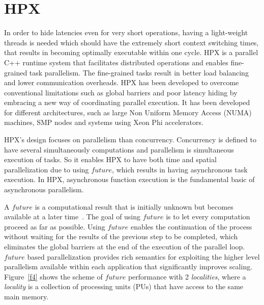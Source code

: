\documentclass[conference]{IEEEtran}
\begin{document}
\section{HPX}
\label{sec:hpx}

In order to hide latencies even for very short operations, having a light-weight threads is needed which should have the extremely short context switching times, that results in becoming optimally executable within one cycle. HPX is a parallel C++ runtime system that facilitates distributed operations and enables fine-grained task parallelism. The fine-grained tasks result in better load balancing and lower communication overheads. HPX has been developed  to overcome conventional limitations such as global barriers and poor latency hiding \cite{r6} by embracing a new way of coordinating parallel execution. It has been developed for different architectures, such as large Non Uniform Memory Access (NUMA) machines, SMP nodes and systems using Xeon Phi accelerators.


HPX's design focuses on parallelism than concurrency. Concurrency is defined to have several simultaneously computations and parallelism is simultaneous execution of tasks\cite{r15}. So it enables HPX to have both time and spatial parallelization \cite{r19} due to using \textit{$future$}, which results in having asynchronous task execution. In HPX, asynchronous function execution is the fundamental basic of asynchronous parallelism.

A \textit{$future$} is a computational result that is initially unknown but becomes available at a later time~\cite{r20}. The goal of using \textit{$future$} is to let every computation proceed as far as possible. Using \textit{$future$} enables the continuation of the process without waiting for the results of the previous step to be completed, which eliminates the global barriers at the end of the execution of the parallel loop. \textit{$future$} based parallelization provides rich semantics for exploiting the higher level parallelism available within each application that significantly improves scaling. Figure~\ref{f4} shows the scheme of \textit{$future$} performance with 2 \textit{localities}, where a \textit{locality} is a collection of processing units (PUs) that have access to the same main memory. 
\end{document}
